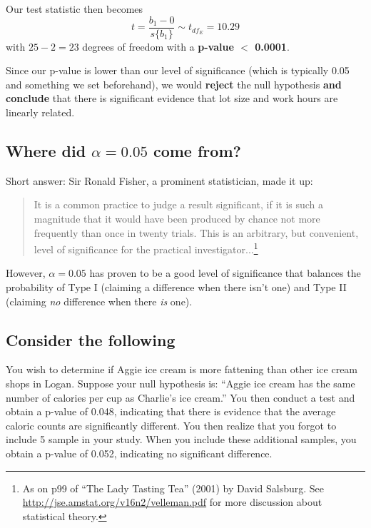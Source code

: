 \documentclass[12pt]{notes}
\begin{document}
\nspace
Our test statistic then becomes
\[
t = \frac{b_1 - 0}{s\{b_1\}} \sim t_{df_E} = 10.29
\]
with $25-2 = 23$ degrees of freedom with a \textbf{p-value $<$ 0.0001}.

\begin{minipage}[l][3cm][c]{\textwidth}

\nspace 

\end{minipage}

Since our p-value is lower than our level of significance (which is typically 0.05 and something we set beforehand), we would \textbf{reject} the null hypothesis \textbf{and conclude} that there is significant evidence that lot size and work hours are linearly related. 

\subsection*{Where did $\alpha = 0.05$ come from?}
Short answer: Sir Ronald Fisher, a prominent statistician, made it up:

\begin{quotation}
It is a common practice to judge a result significant, if it is such a magnitude that it would have been produced by chance not more frequently than once in twenty trials. This is an arbitrary, but convenient, level of significance for the practical investigator...\footnote{As on p99 of ``The Lady Tasting Tea'' (2001) by David Salsburg. See \url{http://jse.amstat.org/v16n2/velleman.pdf} for more discussion about statistical theory.}
\end{quotation}

However, $\alpha = 0.05$ has proven to be a good level of significance that balances the probability of Type I (claiming a difference when there isn't one) and Type II (claiming \textit{no} difference when there \textit{is} one). 


\subsection*{Consider the following}

You wish to determine if Aggie ice cream is more fattening than other ice cream shops in Logan. Suppose your null hypothesis is: ``Aggie ice cream has the same number of calories per cup as Charlie's ice cream.'' You then conduct a test and obtain a p-value of 0.048, indicating that there is evidence that the average caloric counts are significantly different. You then realize that you forgot to include 5 sample in your study. When you include these additional samples, you obtain a p-value of 0.052, indicating no significant difference. 
\end{document}
